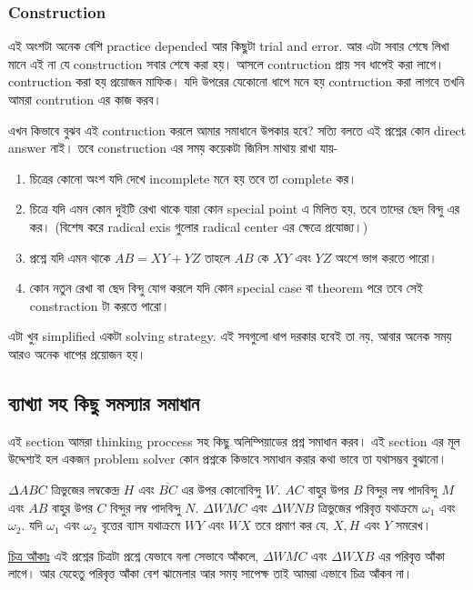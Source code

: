 \documentclass[a4paper,11pt]{article}
\begin{document}
\subsubsection{Construction} এই অংশটা অনেক বেশি practice depended আর কিছুটা trial and error. আর এটা সবার শেষে লিখা মানে এই না যে construction সবার শেষে করা হয়। আসলে contruction প্রায় সব ধাপেই করা লাগে। contruction করা হয় প্রয়োজন মাফিক। যদি উপরের যেকোনো ধাপে মনে হয় contruction করা লাগবে তখনি আমরা contrution এর কাজ করব। 

এখন কিভাবে বুঝব এই contruction করলে আমার সমাধানে উপকার হবে? সত্যি বলতে এই প্রশ্নের কোন direct answer নাই। তবে construction এর সময় কয়েকটা জিনিস মাথায় রাখা যায়- 
\begin{enumerate}
	\item চিত্রের কোনো অংশ যদি দেখে incomplete মনে হয় তবে তা complete কর।  
	\item চিত্রে যদি এমন কোন দুইটি রেখা থাকে যারা কোন special point এ মিলিত হয়, তবে তাদের ছেদ বিন্দু এর কর। (বিশেষ করে radical exis গুলোর radical center এর ক্ষেত্রে প্রযোজ্য।)
	\item প্রশ্নে যদি এমন থাকে $AB=XY+YZ$ তাহলে $AB$ কে $XY$ এবং $YZ$ অংশে ভাগ করতে পারো। 
	\item কোন নতুন রেখা বা ছেদ বিন্দু যোগ করলে যদি কোন special case বা theorem পরে তবে সেই constraction টা করতে পারো। 
\end{enumerate}
এটা খুব simplified একটা solving strategy. এই সবগুলো ধাপ দরকার হবেই তা নয়, আবার অনেক সময় আরও অনেক ধাপের প্রয়োজন হয়। 
\newpage

\subsection{ব্যাখ্যা সহ কিছু সমস্যার সমাধান}
এই section আমরা thinking proccess সহ কিছু অলিম্পিয়াডের প্রশ্ন সমাধান করব। এই section এর মূল উদ্দেশ্যই হল একজন problem solver কোন প্রশ্নকে কিভাবে সমাধান করার কথা ভাবে তা যথাসম্ভব বুঝানো। 

\begin{xmpl}[IMO 2013/4] 
	$\Delta ABC$ ত্রিভুজের লম্বকেন্দ্র $H$ এবং $\overline{BC}$ এর উপর কোনোবিন্দু $W$. $AC$ বাহুর উপর $B$ বিন্দুর লম্ব পাদবিন্দু $M$ এবং $AB$ বাহুর উপর $C$ বিন্দুর লম্ব পাদবিন্দু $N$. $\Delta WMC$ এবং $\Delta WNB$ ত্রিভুজের পরিবৃত্ত যথাক্রমে $\omega_1$ এবং $\omega_2$. যদি $\omega_1$ এবং $\omega_2$ বৃত্তের ব্যাস যথাক্রমে $WY$ এবং $WX$ তবে প্রমাণ কর যে, $X,H$ এবং $Y$ সমরেখ। 
\end{xmpl}
\underline{চিত্র আঁকাঃ} এই প্রশ্নের চিত্রটা প্রশ্নে যেভাবে বলা সেভাবে আঁকলে, $\Delta WMC$ এবং $\Delta WXB$ এর পরিবৃত্ত আঁকা লাগে। আর যেহেতু পরিবৃত্ত আঁকা বেশ ঝামেলার আর সময় সাপেক্ষ তাই আমরা এভাবে চিত্র আঁকব না। 
\end{document}
